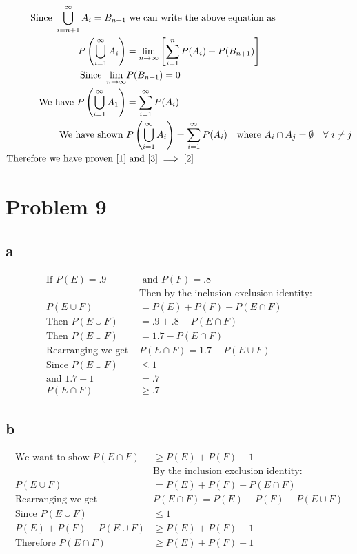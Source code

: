 \documentclass{article}
\begin{document}
\begin{flushleft}
\begin{align*}
\text{Since } \bigcup_{i=n+1}^{\infty}A_i = B_{n+1} &\text{ we can write the above equation as}\\
P\left(\bigcup_{i=1}^{\infty}A_i \right)&=\lim_{n\to \infty}\left[\sum \limits_{i=1}^{n}P(A_i)+P(B_{n+1})\right]\\
\text{Since } \lim_{n\to \infty} &P(B_{n+1})=0 \\
\text{We have } P\left(\bigcup_{i=1}^{\infty}A_1 \right)&=\sum \limits_{i=1}^{\infty}P(A_i)\\
\text{We have shown } &P\left(\bigcup_{i=1}^{\infty}A_i \right)=\sum \limits_{i=1}^{\infty}P(A_i) \quad \text{where } A_i \cap A_j = \emptyset \quad \forall \ i \neq j \\
\text{Therefore we have proven }\eqref{1} &\text{ and } \eqref{3} \implies \eqref{2}
\end{align*}
\section*{Problem 9}
\subsection*{a}
\begin{align*}
\text{If } P(E)=.9 &\text{ and } P(F)=.8\\
&\text{Then by the inclusion exclusion identity:}\\
P(E \cup F)&= P(E)+P(F)-P(E \cap F)\\
\text{Then } P(E \cup F)&= .9+.8-P(E \cap F)\\
\text{Then } P(E \cup F)&= 1.7-P(E \cap F)\\
\text{Rearranging we get } &P(E \cap F)= 1.7-P(E \cup F)\\
\text{Since } P(E \cup F) &\leq 1\\
\text{and } 1.7-1&=.7\\
P(E \cap F)&\geq .7
\end{align*}
\subsection*{b}
\begin{align*}
\text{We want to show } P(E \cap F)&\geq P(E)+P(F)-1\\
&\text{By the inclusion exclusion identity:}\\
P(E \cup F)&= P(E)+P(F)-P(E \cap F)\\
\text{Rearranging we get } &P(E \cap F)= P(E)+P(F)-P(E \cup F)\\
\text{Since } P(E \cup F) &\leq 1\\
P(E)+P(F)-P(E \cup F)&\geq P(E)+P(F)-1\\
\text{Therefore } P(E \cap F)&\geq P(E)+P(F)-1
\end{align*}

\end{flushleft}
\end{document}
